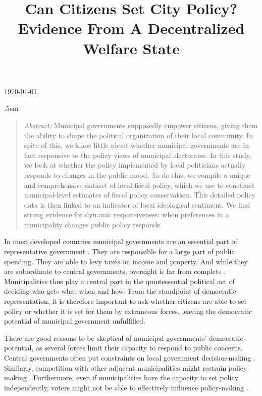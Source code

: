 \documentclass[a4paper,12pt]{article}
\title{\bigskip \bigskip \sffamily \LARGE{Can Citizens Set City Policy?} \\ \Large{ Evidence From A Decentralized Welfare State}}
\makeatletter
\renewcommand{\maketitle}{
	\begin{flushleft}
		
		\onehalfspacing
		
		\@title
		
		\lineskip .5em
		\normalfont{\normalsize{\@author}}
\end{flushleft}}
\makeatother
\begin{document}
\begin{footnotesize} \noindent \today. \end{footnotesize} %

\vspace{0.7in}

\maketitle

\bigskip

\begin{quotation} %
	
	\small \noindent \emph{Abstract:} Municipal governments supposedly empower citizens, giving them the ability to shape the political organization of their local community. In spite of this, we know little about whether municipal governments are in fact responsive to the policy views of municipal electorates. In this study, we look at whether the policy implemented by local politicians actually responds to changes in the public mood. To do this, we compile a unique and comprehensive dataset of local fiscal policy, which we use to construct municipal-level estimates of fiscal policy conservatism. This detailed policy data is then linked to an indicator of local ideological sentiment. We find strong evidence for dynamic responsiveness: when preferences in a municipality changes public policy responds.
\end{quotation}




\thispagestyle{empty} %


\clearpage

\noindent In most developed countries municipal governments are an essential part of representative government \citep{trounstine2009all,kersting2013reforming}. They are responsible for a large part of public spending.  They are able to levy taxes on income and property. And while they are subordinate to central governments, oversight is far from complete \citep{oecd2016subnational}. Municipalities thus play a central part in the quintessential political act of deciding who gets what when and how. From the standpoint of democratic representation, it is therefore important to ask whether citizens are able to set policy or whether it is set for them by extraneous forces, leaving the democratic potential of municipal government unfulfilled.


There are good reasons to be skeptical of municipal governments' democratic potential, as several forces limit their capacity to respond to public concerns. Central governments often put constraints on local government decision-making \citep{peterson1981city}. Similarly, competition with other adjacent municipalities might restrain policy-making \citep{salmon2006horizontal}. Furthermore, even if municipalities have the capacity to set policy independently, voters might not be able to effectively influence policy-making \citep[e.g.,][]{gerber2011mayors}. 
\end{document}
